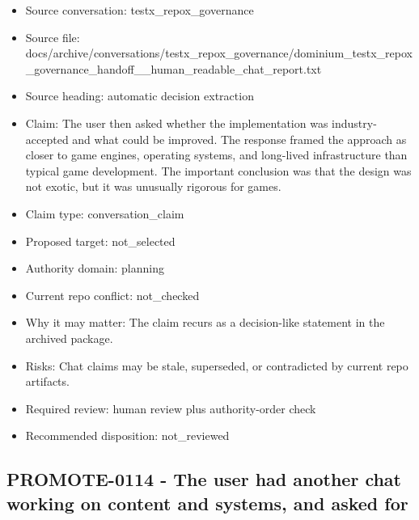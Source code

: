 \documentclass[11pt,a4paper]{report}
\begin{document}
\begin{itemize}
\item Source conversation: testx\_repox\_governance
\item Source file: docs/archive/conversations/testx\_repox\_governance/dominium\_testx\_repox\_governance\_handoff\_\_human\_readable\_chat\_report.txt
\item Source heading: automatic decision extraction
\item Claim: The user then asked whether the implementation was industry-accepted and what could be improved. The response framed the approach as closer to game engines, operating systems, and long-lived infrastructure than typical game development. The important conclusion was that the design was not exotic, but it was unusually rigorous for games.
\item Claim type: conversation\_claim
\item Proposed target: not\_selected
\item Authority domain: planning
\item Current repo conflict: not\_checked
\item Why it may matter: The claim recurs as a decision-like statement in the archived package.
\item Risks: Chat claims may be stale, superseded, or contradicted by current repo artifacts.
\item Required review: human review plus authority-order check
\item Recommended disposition: not\_reviewed
\end{itemize}

\subsection{PROMOTE-0114 - The user had another chat working on content and systems, and asked for}
\end{document}
